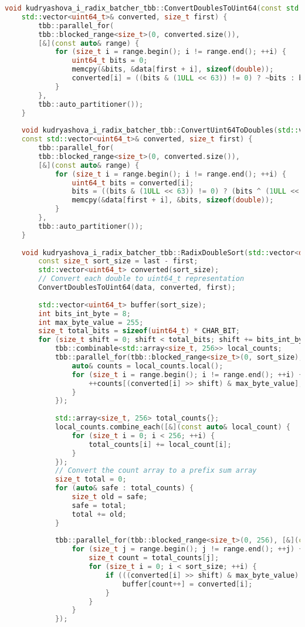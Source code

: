 \documentclass[12pt,a4paper]{extarticle}
\begin{document}
\begin{lstlisting}[language=C++]
	void kudryashova_i_radix_batcher_tbb::ConvertDoublesToUint64(const std::vector<double>& data,
	std::vector<uint64_t>& converted, size_t first) {
		tbb::parallel_for(
		tbb::blocked_range<size_t>(0, converted.size()),
		[&](const auto& range) {
			for (size_t i = range.begin(); i != range.end(); ++i) {
				uint64_t bits = 0;
				memcpy(&bits, &data[first + i], sizeof(double));
				converted[i] = ((bits & (1ULL << 63)) != 0) ? ~bits : bits ^ (1ULL << 63);
			}
		},
		tbb::auto_partitioner());
	}
	
	void kudryashova_i_radix_batcher_tbb::ConvertUint64ToDoubles(std::vector<double>& data,
	const std::vector<uint64_t>& converted, size_t first) {
		tbb::parallel_for(
		tbb::blocked_range<size_t>(0, converted.size()),
		[&](const auto& range) {
			for (size_t i = range.begin(); i != range.end(); ++i) {
				uint64_t bits = converted[i];
				bits = ((bits & (1ULL << 63)) != 0) ? (bits ^ (1ULL << 63)) : ~bits;
				memcpy(&data[first + i], &bits, sizeof(double));
			}
		},
		tbb::auto_partitioner());
	}
	
	void kudryashova_i_radix_batcher_tbb::RadixDoubleSort(std::vector<double>& data, size_t first, size_t last) {
		const size_t sort_size = last - first;
		std::vector<uint64_t> converted(sort_size);
		// Convert each double to uint64_t representation
		ConvertDoublesToUint64(data, converted, first);
		
		std::vector<uint64_t> buffer(sort_size);
		int bits_int_byte = 8;
		int max_byte_value = 255;
		size_t total_bits = sizeof(uint64_t) * CHAR_BIT;
		for (size_t shift = 0; shift < total_bits; shift += bits_int_byte) {
			tbb::combinable<std::array<size_t, 256>> local_counts;
			tbb::parallel_for(tbb::blocked_range<size_t>(0, sort_size), [&](const auto& range) {
				auto& counts = local_counts.local();
				for (size_t i = range.begin(); i != range.end(); ++i) {
					++counts[(converted[i] >> shift) & max_byte_value];
				}
			});
			
			std::array<size_t, 256> total_counts{};
			local_counts.combine_each([&](const auto& local_count) {
				for (size_t i = 0; i < 256; ++i) {
					total_counts[i] += local_count[i];
				}
			});
			// Convert the count array to a prefix sum array
			size_t total = 0;
			for (auto& safe : total_counts) {
				size_t old = safe;
				safe = total;
				total += old;
			}
			
			tbb::parallel_for(tbb::blocked_range<size_t>(0, 256), [&](const auto& range) {
				for (size_t j = range.begin(); j != range.end(); ++j) {
					size_t count = total_counts[j];
					for (size_t i = 0; i < sort_size; ++i) {
						if (((converted[i] >> shift) & max_byte_value) == j) {
							buffer[count++] = converted[i];
						}
					}
				}
			});
			

\end{lstlisting}
\end{document}
